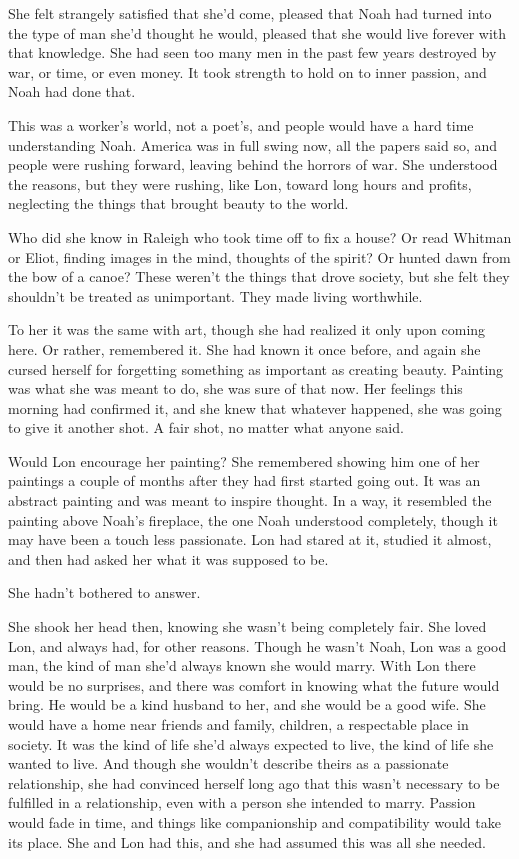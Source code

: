 \documentclass[10pt, twoside, openright]{book}
\begin{document}
She felt strangely satisfied that she'd come, pleased that Noah had
turned into the type of man she'd thought he would, pleased that she
would live forever with that knowledge. She had seen too many men in the
past few years destroyed by war, or time, or even money. It took
strength to hold on to inner passion, and Noah had done that.

This was a worker's world, not a poet's, and people would have a hard
time understanding Noah. America was in full swing now, all the papers
said so, and people were rushing forward, leaving behind the horrors of
war. She understood the reasons, but they were rushing, like Lon, toward
long hours and profits, neglecting the things that brought beauty to the
world.

Who did she know in Raleigh who took time off to fix a house? Or read
Whitman or Eliot, finding images in the mind, thoughts of the spirit? Or
hunted dawn from the bow of a canoe? These weren't the things that drove
society, but she felt they shouldn't be treated as unimportant. They
made living worthwhile.

To her it was the same with art, though she had realized it only upon
coming here. Or rather, remembered it. She had known it once before, and
again she cursed herself for forgetting something as important as
creating beauty. Painting was what she was meant to do, she was sure of
that now. Her feelings this morning had confirmed it, and she knew that
whatever happened, she was going to give it another shot. A fair shot,
no matter what anyone said.

Would Lon encourage her painting? She remembered showing him one of her
paintings a couple of months after they had first started going out. It
was an abstract painting and was meant to inspire thought. In a way, it
resembled the painting above Noah's fireplace, the one Noah understood
completely, though it may have been a touch less passionate. Lon had
stared at it, studied it almost, and then had asked her what it was
supposed to be.

She hadn't bothered to answer.

She shook her head then, knowing she wasn't being completely fair. She
loved Lon, and always had, for other reasons. Though he wasn't Noah, Lon
was a good man, the kind of man she'd always known she would marry. With
Lon there would be no surprises, and there was comfort in knowing what
the future would bring. He would be a kind husband to her, and she would
be a good wife. She would have a home near friends and family, children,
a respectable place in society. It was the kind of life she'd always
expected to live, the kind of life she wanted to live. And though she
wouldn't describe theirs as a passionate relationship, she had convinced
herself long ago that this wasn't necessary to be fulfilled in a
relationship, even with a person she intended to marry. Passion would
fade in time, and things like companionship and compatibility would take
its place. She and Lon had this, and she had assumed this was all she
needed.
\end{document}
